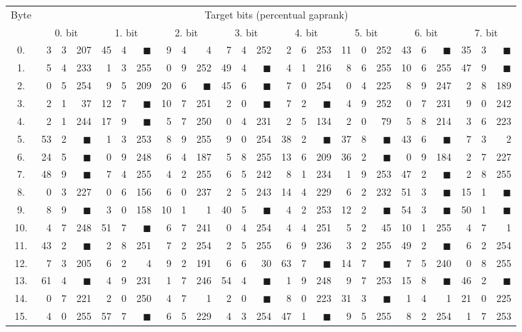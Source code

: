 \begin{tabular}{| c | r@{.} l@{\quad}r | r@{.} l@{\quad}r | r@{.} l@{\quad}r | r@{.} l@{\quad}r | r@{.} l@{\quad}r | r@{.} l@{\quad}r | r@{.} l@{\quad}r | r@{.} l@{\quad}r |}
	\hline
	\multirow{2}{*}{Byte} & \multicolumn{24}{c|}{Target bits (percentual gap\quad rank)} \\
	\cline{2-25}
	~ & \multicolumn{3}{c|}{0. bit} & \multicolumn{3}{c|}{1. bit} & \multicolumn{3}{c|}{2. bit} & \multicolumn{3}{c|}{3. bit} & \multicolumn{3}{c|}{4. bit} & \multicolumn{3}{c|}{5. bit} & \multicolumn{3}{c|}{6. bit} & \multicolumn{3}{c|}{7. bit} \\
	\hline
	0.&3&3&207&45&4&$\blacksquare$&9&4&4&7&4&252&2&6&253&11&0&252&43&6&$\blacksquare$&35&3&$\blacksquare$\\
	\hline
	1.&5&4&233&1&3&255&0&9&252&49&4&$\blacksquare$&4&1&216&8&6&255&10&6&255&47&9&$\blacksquare$\\
	\hline
	2.&0&5&254&9&5&209&20&6&$\blacksquare$&45&6&$\blacksquare$&7&0&254&0&4&225&8&9&247&2&8&189\\
	\hline
	3.&2&1&37&12&7&$\blacksquare$&10&7&251&2&0&$\blacksquare$&7&2&$\blacksquare$&4&9&252&0&7&231&9&0&242\\
	\hline
	4.&2&1&244&17&9&$\blacksquare$&5&7&250&0&4&231&2&5&134&2&0&79&5&8&214&3&6&223\\
	\hline
	5.&53&2&$\blacksquare$&1&3&253&8&9&255&9&0&254&38&2&$\blacksquare$&37&8&$\blacksquare$&43&6&$\blacksquare$&7&3&2\\
	\hline
	6.&24&5&$\blacksquare$&0&9&248&6&4&187&5&8&255&13&6&209&36&2&$\blacksquare$&0&9&184&2&7&227\\
	\hline
	7.&48&9&$\blacksquare$&7&4&255&4&2&255&6&5&242&8&1&234&1&9&253&47&2&$\blacksquare$&2&8&255\\
	\hline
	8.&0&3&227&0&6&156&6&0&237&2&5&243&14&4&229&6&2&232&51&3&$\blacksquare$&15&1&$\blacksquare$\\
	\hline
	9.&8&9&$\blacksquare$&3&0&158&10&1&1&40&5&$\blacksquare$&4&2&253&12&2&$\blacksquare$&54&3&$\blacksquare$&50&1&$\blacksquare$\\
	\hline
	10.&4&7&248&51&7&$\blacksquare$&6&7&241&0&4&254&4&4&251&5&2&45&10&1&255&4&7&1\\
	\hline
	11.&43&2&$\blacksquare$&2&8&251&7&2&254&2&5&255&6&9&236&3&2&255&49&2&$\blacksquare$&6&2&254\\
	\hline
	12.&7&3&205&6&2&4&9&2&191&6&6&30&63&7&$\blacksquare$&14&7&$\blacksquare$&7&5&240&0&8&255\\
	\hline
	13.&61&4&$\blacksquare$&4&9&231&1&7&246&54&4&$\blacksquare$&1&9&248&9&7&253&15&8&$\blacksquare$&46&2&$\blacksquare$\\
	\hline
	14.&0&7&221&2&0&250&4&7&1&2&0&$\blacksquare$&8&0&223&31&3&$\blacksquare$&1&4&1&21&0&225\\
	\hline
	15.&4&0&255&57&7&$\blacksquare$&6&5&229&4&3&254&47&1&$\blacksquare$&9&5&255&8&2&254&1&7&253\\
	\hline
\end{tabular}